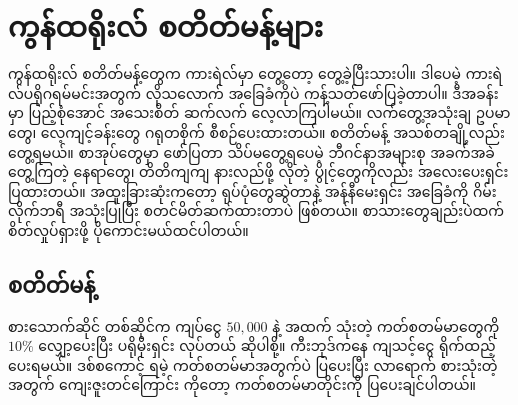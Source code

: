 \chapter{ကွန်ထရိုးလ် စတိတ်မန့်များ}

ကွန်ထရိုးလ် စတိတ်မန့်တွေက ကားရဲလ်မှာ တွေ့တော့ တွေ့ခဲ့ပြီးသားပါ။ ဒါပေမဲ့ ကားရဲလ်ပရိုဂရမ်မင်းအတွက် လိုသလောက် အခြေခံကိုပဲ ကန့်သတ်ဖော်ပြခဲ့တာပါ။ ဒီအခန်းမှာ ပြည့်စုံအောင် အသေးစိတ် ဆက်လက် လေ့လာကြပါမယ်။ လက်တွေ့အသုံးချ ဥပမာတွေ၊ လေ့ကျင့်ခန်းတွေ ဂရုတစိုက် စီစဉ်ပေးထားတယ်။ စတိတ်မန့် အသစ်တချို့လည်း တွေ့ရမယ်။ စာအုပ်တွေမှာ ဖော်ပြတာ သိပ်မတွေ့ရပေမဲ့ ဘီဂင်နာအများစု အခက်အခဲတွေ့ကြတဲ့ နေရာတွေ၊ တိတိကျကျ နားလည်ဖို့ လိုတဲ့ ပွိုင့်တွေကိုလည်း အလေးပေးရှင်းပြထားတယ်။ အထူးခြားဆုံးကတော့ ရုပ်ပုံတွေဆွဲတာနဲ့ အန်နီမေးရှင်း အခြေခံကို  ဂိမ်းလိုက်ဘရီ အသုံး\allowbreak ပြုပြီး စတင်မိတ်ဆက်ထားတာပဲ ဖြစ်တယ်။ စာသားတွေချည်းပဲထက် စိတ်လှုပ်ရှားဖို့ ပိုကောင်းမယ်ထင်ပါတယ်။

\section{ စတိတ်မန့်}
စားသောက်ဆိုင် တစ်ဆိုင်က ကျပ်ငွေ \(50,000\) နဲ့ အထက် သုံးတဲ့ ကတ်စတမ်မာတွေကို $10 \%$ လျှော့ပေးပြီး ပရိုမိုးရှင်း လုပ်တယ် ဆိုပါစို့။  ကီးဘုဒ်ကနေ ကျသင့်ငွေ ရိုက်ထည့်ပေးရမယ်။  ဒစ်စကောင့် ရမဲ့ ကတ်စတမ်မာအတွက်ပဲ  ပြပေးပြီး လာရောက် စားသုံးတဲ့အတွက် ကျေးဇူးတင်ကြောင်း  ကိုတော့ ကတ်စတမ်မာတိုင်းကို ပြပေးချင်ပါတယ်။


